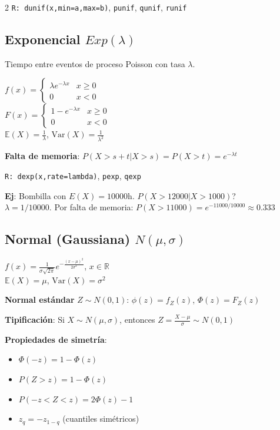 \documentclass[9pt,a4paper]{article}
\newcommand{\E}{\mathbb{E}}
\newcommand{\Var}{\text{Var}}
\newcommand{\R}{\texttt{R: }}
\begin{document}
\begin{multicols}{2}
\R\texttt{dunif(x,min=a,max=b)}, \texttt{punif}, \texttt{qunif}, \texttt{runif}

\subsection{Exponencial $Exp(\lambda)$}
Tiempo entre eventos de proceso Poisson con tasa $\lambda$.
\begin{formulabox}
$f(x)=\begin{cases}\lambda e^{-\lambda x} & x\geq 0\\0 & x<0\end{cases}$\\[5pt]
$F(x)=\begin{cases}1-e^{-\lambda x} & x\geq 0\\0 & x<0\end{cases}$\\[5pt]
$\E(X)=\frac{1}{\lambda}$, \quad $\Var(X)=\frac{1}{\lambda^2}$
\end{formulabox}

\begin{alertbox}
\textbf{Falta de memoria}: $P(X>s+t|X>s)=P(X>t)=e^{-\lambda t}$
\end{alertbox}

\R\texttt{dexp(x,rate=lambda)}, \texttt{pexp}, \texttt{qexp}

\begin{exbox}
\textbf{Ej}: Bombilla con $E(X)=10000$h. $P(X>12000|X>1000)$?\\
$\lambda=1/10000$. Por falta de memoria: $P(X>11000)=e^{-11000/10000}\approx 0.333$
\end{exbox}

\subsection{Normal (Gaussiana) $N(\mu,\sigma)$}
\begin{formulabox}
$f(x)=\frac{1}{\sigma\sqrt{2\pi}}e^{-\frac{(x-\mu)^2}{2\sigma^2}}$, \quad $x\in\mathbb{R}$\\[3pt]
$\E(X)=\mu$, \quad $\Var(X)=\sigma^2$
\end{formulabox}

\textbf{Normal estándar} $Z\sim N(0,1)$: $\phi(z)=f_Z(z)$, $\Phi(z)=F_Z(z)$

\textbf{Tipificación}: Si $X\sim N(\mu,\sigma)$, entonces $Z=\frac{X-\mu}{\sigma}\sim N(0,1)$

\textbf{Propiedades de simetría}:
\begin{itemize}[leftmargin=*]
\item $\Phi(-z)=1-\Phi(z)$
\item $P(Z>z)=1-\Phi(z)$
\item $P(-z<Z<z)=2\Phi(z)-1$
\item $z_q=-z_{1-q}$ (cuantiles simétricos)
\end{itemize}


\end{multicols}
\end{document}
